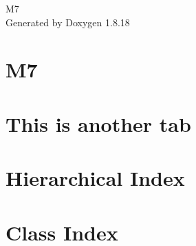 \let\mypdfximage\pdfximage\def\pdfximage{\immediate\mypdfximage}\documentclass[twoside]{book}
\newcommand{\+}{\discretionary{\mbox{\scriptsize$\hookleftarrow$}}{}{}}
\newcommand{\clearemptydoublepage}{%
  \newpage{\pagestyle{empty}\cleardoublepage}%
}
\begin{document}
\hypersetup{pageanchor=false,
             bookmarksnumbered=true,
             pdfencoding=unicode
            }
\begin{titlepage}
\vspace*{7cm}
\begin{center}%
{\Large M7 }\\
\vspace*{1cm}
{\large Generated by Doxygen 1.8.18}\\
\end{center}
\end{titlepage}
\clearemptydoublepage
{}
\tableofcontents
\clearemptydoublepage
{}
\hypersetup{pageanchor=true}

\chapter{M7}
\label{index}\hypertarget{index}{}
\chapter{This is another tab}
\label{md_wiki_overview}

\chapter{Hierarchical Index}

\chapter{Class Index}

\end{document}
